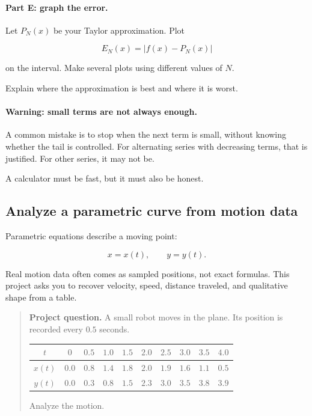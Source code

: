 \paragraph{Part E: graph the error.}
Let \(P_N(x)\) be your Taylor approximation.  Plot

\[
E_N(x)=|f(x)-P_N(x)|
\]

on the interval.  Make several plots using different values of \(N\).

Explain where the approximation is best and where it is worst.

\paragraph{Warning: small terms are not always enough.}
A common mistake is to stop when the next term is small, without knowing whether the
tail is controlled.  For alternating series with decreasing terms, that is justified.  For
other series, it may not be.

A calculator must be fast, but it must also be honest.

\subsection{Analyze a parametric curve from motion data}
\label{subsec:project-parametric-motion-data}

Parametric equations describe a moving point:

\[
x=x(t),
\qquad
y=y(t).
\]

Real motion data often comes as sampled positions, not exact formulas.  This project asks
you to recover velocity, speed, distance traveled, and qualitative shape from a table.

\begin{quote}
\textbf{Project question.}
A small robot moves in the plane.  Its position is recorded every \(0.5\) seconds.

\begin{center}
\renewcommand{\arraystretch}{1.25}
\begin{tabular}{c|ccccccccc}
\(t\) & \(0\) & \(0.5\) & \(1.0\) & \(1.5\) & \(2.0\) & \(2.5\) & \(3.0\) & \(3.5\) & \(4.0\) \\ \hline
\(x(t)\) & \(0.0\) & \(0.8\) & \(1.4\) & \(1.8\) & \(2.0\) & \(1.9\) & \(1.6\) & \(1.1\) & \(0.5\) \\
\(y(t)\) & \(0.0\) & \(0.3\) & \(0.8\) & \(1.5\) & \(2.3\) & \(3.0\) & \(3.5\) & \(3.8\) & \(3.9\)
\end{tabular}
\end{center}

Analyze the motion.
\end{quote}

